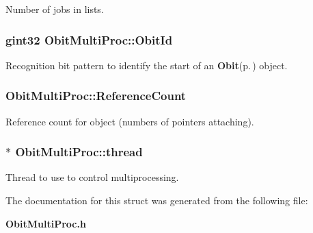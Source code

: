 Number of jobs in lists. 

\subsubsection{\setlength{\rightskip}{0pt plus 5cm}gint32 {\bf Obit\-Multi\-Proc::Obit\-Id}}\label{structObitMultiProc_o0}


Recognition bit pattern to identify the start of an {\bf Obit}{\rm (p.\,\pageref{structObit})} object. 

\subsubsection{ {\bf Obit\-Multi\-Proc::Reference\-Count}}\label{structObitMultiProc_o2}


Reference count for object (numbers of pointers attaching). 

\subsubsection{$\ast$ {\bf Obit\-Multi\-Proc::thread}}\label{structObitMultiProc_o4}


Thread to use to control multiprocessing. 



The documentation for this struct was generated from the following file:\begin{CompactItemize}
\item 
{\bf Obit\-Multi\-Proc.h}\end{CompactItemize}
